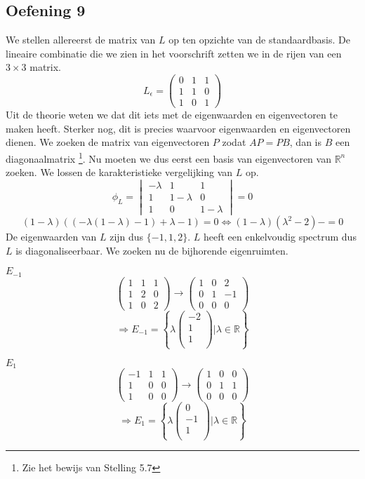 \documentclass[lineaire_algebra_oplossingen.tex]{subfiles}
\begin{document}
\subsection{Oefening 9}
We stellen allereerst de matrix van $L$ op ten opzichte van de standaardbasis. De lineaire combinatie die we zien in het voorschrift zetten we in de rijen van een $3\times 3$ matrix.
\[
L_\epsilon = 
\begin{pmatrix}
0 & 1 & 1\\
1 & 1 & 0\\
1 & 0 & 1
\end{pmatrix}
\]
Uit de theorie weten we dat dit iets met de eigenwaarden en eigenvectoren te maken heeft. Sterker nog, dit is precies waarvoor eigenwaarden en eigenvectoren dienen. We zoeken de matrix van eigenvectoren $P$ zodat $AP = PB$, dan is $B$ een diagonaalmatrix \footnote{Zie het bewijs van Stelling 5.7}.
Nu moeten we dus eerst een basis van eigenvectoren van $\mathbb{R}^n$ zoeken.
We lossen de karakteristieke vergelijking van $L$ op.
\[
\phi_L = 
\begin{vmatrix}
-\lambda & 1 & 1\\
1 & 1-\lambda & 0\\
1 & 0 & 1-\lambda
\end{vmatrix}
= 0
\]
\[
(1-\lambda)((-\lambda(1-\lambda)-1) +\lambda-1) = 0 \Leftrightarrow (1-\lambda)(\lambda^2-2)-=0
\]
De eigenwaarden van $L$ zijn dus $\{-1,1,2\}$. $L$ heeft een enkelvoudig spectrum dus $L$ is diagonaliseerbaar.
We zoeken nu de bijhorende eigenruimten.

\emph{$E_{-1}$}\\
\[
\begin{pmatrix}
1 & 1 & 1\\
1 & 2 & 0\\
1 & 0 & 2
\end{pmatrix}
\rightarrow
\begin{pmatrix}
1 & 0 & 2\\
0 & 1 & -1\\
0 & 0 & 0
\end{pmatrix}
\]
\[
\Rightarrow E_{-1} = 
\left\{ 
\lambda
\begin{pmatrix}
-2\\1\\1\\
\end{pmatrix}
| \lambda \in \mathbb{R}
\right\}
\]

\emph{$E_1$}\\
\[
\begin{pmatrix}
-1 & 1 & 1\\
1 & 0 & 0\\
1 & 0 & 0
\end{pmatrix}
\rightarrow
\begin{pmatrix}
1 & 0 & 0\\
0 & 1 & 1\\
0 & 0 & 0
\end{pmatrix}
\]
\[
\Rightarrow E_1 = 
\left\{ 
\lambda
\begin{pmatrix}
0\\-1\\1\\
\end{pmatrix}
| \lambda \in \mathbb{R}
\right\}
\]
\end{document}

